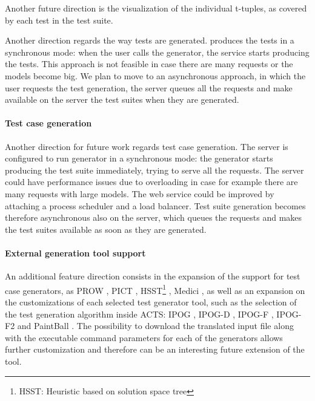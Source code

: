 \begin{tikzborder}{\cite{Gargantini16:validation}}
\begin{tikzborder}{\cite{gargantini_combinatorial_2017}}
\begin{tikzborder}{\cite{garn2019}}
\begin{tikzborder}{\cite{arcaini2019achieving}}
\begin{tikzborder}{}
Another future direction is the visualization of the individual t-tuples, as covered by each test in the test suite.
\end{tikzborder}

Another direction regards the way tests are generated. \ctwedge produces the tests in a synchronous mode: when the user calls the generator, the service starts producing the tests. This approach is not feasible in case there are many requests or the models become big. We plan to move to an asynchronous approach, in which the user requests the test generation, the server queues all the requests and make available on the server the test suites when they are generated. 

\paragraph{Test case generation}
\begin{tikzborder}{\cite{IWCTGargantini2018}}
Another direction for future work regards test case generation. The server is configured to run \ctwedge generator in a synchronous mode: the generator starts producing the test suite immediately, trying to serve all the requests.
The server could have performance issues due to overloading in case for example there are many requests with large models. The web service could be improved by attaching a process scheduler and a load balancer. Test suite generation becomes therefore asynchronous also on the server, which queues the requests and makes the test suites available as soon as they are generated.

\paragraph{External generation tool support}
An additional feature direction consists in the expansion of the support for test case generators, as PROW \cite{2015:PROW}, PICT \cite{pictmaster}, HSST\footnote{HSST: Heuristic based on solution space tree} \cite{Nie2006}, Medici \cite{hvc14}, as well as an expansion on the customizations of each selected test generator tool, such as the selection of the test generation algorithm inside ACTS: IPOG
\cite{ipog}, IPOG-D \cite{ipog}, IPOG-F \cite{forbes2008refining}, IPOG-F2 \cite{forbes2008refining} and PaintBall \cite{318466}. 
The possibility to download the translated input file along with the executable command parameters for each of the generators allows further customization and therefore can be an interesting future extension of the tool.


\end{tikzborder}
\end{tikzborder}
\end{tikzborder}
\end{tikzborder}
\end{tikzborder}

